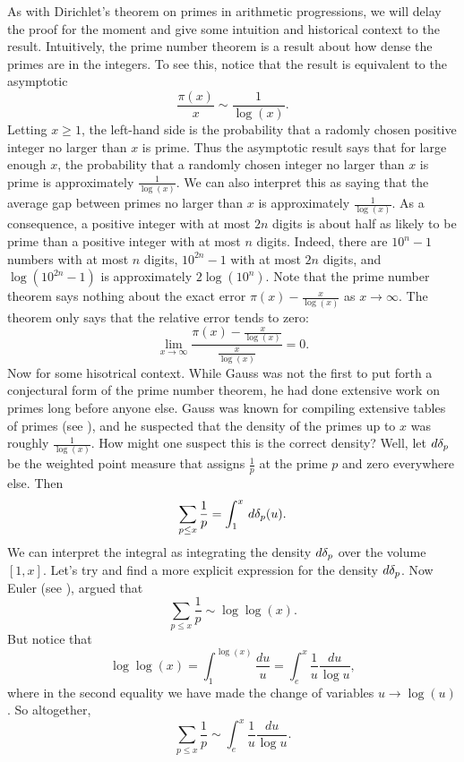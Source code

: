       As with Dirichlet's theorem on primes in arithmetic progressions, we will delay the proof for the moment and give some intuition and historical context to the result. Intuitively, the prime number theorem is a result about how dense the primes are in the integers. To see this, notice that the result is equivalent to the asymptotic
      \[
        \frac{\pi(x)}{x} \sim \frac{1}{\log(x)}.
      \]
      Letting $x \ge 1$, the left-hand side is the probability that a radomly chosen positive integer no larger than $x$ is prime. Thus the asymptotic result says that for large enough $x$, the probability that a randomly chosen integer no larger than $x$ is prime is approximately $\frac{1}{\log(x)}$. We can also interpret this as saying that the average gap between primes no larger than $x$ is approximately $\frac{1}{\log(x)}$. As a consequence, a positive integer with at most $2n$ digits is about half as likely to be prime than a positive integer with at most $n$ digits. Indeed, there are $10^{n}-1$ numbers with at most $n$ digits, $10^{2n}-1$ with at most $2n$ digits, and $\log(10^{2n}-1)$ is approximately $2\log(10^{n})$. Note that the prime number theorem says nothing about the exact error $\pi(x)-\frac{x}{\log(x)}$ as $x \to \infty$. The theorem only says that the relative error tends to zero:
      \[
        \lim_{x \to \infty}\frac{\pi(x)-\frac{x}{\log(x)}}{\frac{x}{\log(x)}} = 0.
      \]
      Now for some hisotrical context. While Gauss was not the first to put forth a conjectural form of the prime number theorem, he had done extensive work on primes long before anyone else. Gauss was known for compiling extensive tables of primes (see \cite{gauss1872tafel}), and he suspected that the density of the primes up to $x$ was roughly $\frac{1}{\log(x)}$. How might one suspect this is the correct density? Well, let $d\delta_{p}$ be the weighted point measure that assigns $\frac{1}{p}$ at the prime $p$ and zero everywhere else. Then
      \[
        \sum_{p \le x}\frac{1}{p} = \int_{1}^{x}\,d\delta_{p}(u).
      \]
      We can interpret the integral as integrating the density $d\delta_{p}$ over the volume $[1,x]$. Let's try and find a more explicit expression for the density $d\delta_{p}$. Now Euler (see \cite{euler1737variae}), argued that
      \[
        \sum_{p \le x}\frac{1}{p} \sim \log\log(x).
      \]
      But notice that
      \[
        \log\log(x) = \int_{1}^{\log(x)}\frac{du}{u} = \int_{e}^{x}\frac{1}{u}\frac{du}{\log{u}},
      \]
      where in the second equality we have made the change of variables $u \to \log(u)$. So altogether,
      \[
        \sum_{p \le x}\frac{1}{p} \sim \int_{e}^{x}\frac{1}{u}\frac{du}{\log{u}}.
      \]

